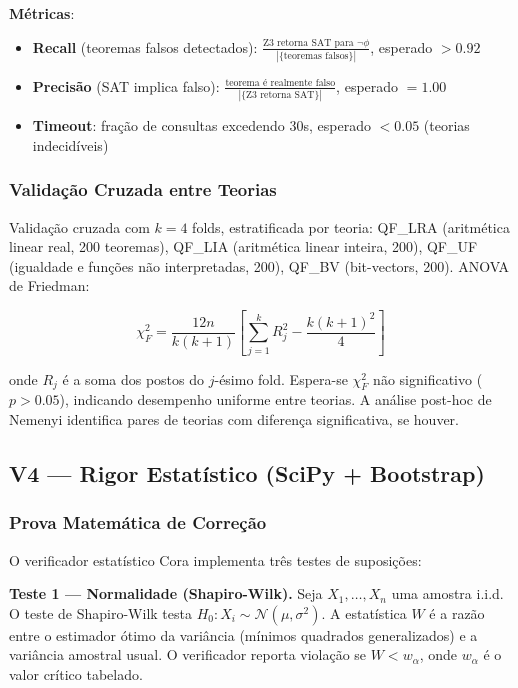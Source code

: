 \documentclass[5p]{elsarticle}
\theoremstyle{remark}
\begin{document}
\textbf{Métricas}:
\begin{itemize}
    \item \textbf{Recall} (teoremas falsos detectados): $\frac{\text{Z3 retorna SAT para } \neg\phi}{|\{\text{teoremas falsos}\}|}$, esperado $> 0.92$
    \item \textbf{Precisão} (SAT implica falso): $\frac{\text{teorema é realmente falso}}{|\{\text{Z3 retorna SAT}\}|}$, esperado $= 1.00$
    \item \textbf{Timeout}: fração de consultas excedendo 30s, esperado $< 0.05$ (teorias indecidíveis)
\end{itemize}

\subsubsection{Validação Cruzada entre Teorias}

Validação cruzada com $k = 4$ folds, estratificada por teoria: QF\_LRA (aritmética linear real, 200 teoremas), QF\_LIA (aritmética linear inteira, 200), QF\_UF (igualdade e funções não interpretadas, 200), QF\_BV (bit-vectors, 200). ANOVA de Friedman:

\begin{equation}
\chi^2_F = \frac{12n}{k(k+1)} \left[ \sum_{j=1}^{k} R_j^2 - \frac{k(k+1)^2}{4} \right]
\label{eq:c3_friedman}
\end{equation}

onde $R_j$ é a soma dos postos do $j$-ésimo fold. Espera-se $\chi^2_F$ não significativo ($p > 0.05$), indicando desempenho uniforme entre teorias. A análise post-hoc de Nemenyi identifica pares de teorias com diferença significativa, se houver.

\subsection{V4 --- Rigor Estatístico (SciPy + Bootstrap)}

\subsubsection{Prova Matemática de Correção}

O verificador estatístico Cora implementa três testes de suposições:

\textbf{Teste 1 --- Normalidade (Shapiro-Wilk).} Seja $X_1, \ldots, X_n$ uma amostra i.i.d. O teste de Shapiro-Wilk testa $H_0: X_i \sim \mathcal{N}(\mu, \sigma^2)$. A estatística $W$ é a razão entre o estimador ótimo da variância (mínimos quadrados generalizados) e a variância amostral usual. O verificador reporta violação se $W < w_{\alpha}$, onde $w_{\alpha}$ é o valor crítico tabelado.
\end{document}
